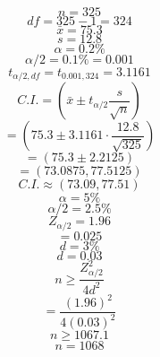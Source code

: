 \documentclass{article}
\begin{document}
    $$n=325$$
$$df = 325-1 = 324$$
$$\bar{x} = 75.3$$
$$s = 12.8$$
$$\alpha = 0.2\%$$
$$\alpha/2 = 0.1\% = 0.001$$
$$t_{\alpha/2, df} = t_{0.001, 324} = 3.1161$$
$$C.I. = \left(\bar{x} \pm t_{\alpha/2} \frac{s}{\sqrt{n}}\right)$$
$$= \left(75.3 \pm 3.1161 \cdot \frac{12.8}{\sqrt{325}}\right)$$
$$= (75.3 \pm 2.2125)$$
$$= (73.0875, 77.5125)$$
$$C.I. \approx (73.09, 77.51)$$
$$\alpha = 5\%$$
$$\alpha/2 = 2.5\%$$
$$Z_{\alpha/2} = 1.96$$
$$= 0.025$$
$$d = 3\%$$
$$d = 0.03$$
$$n \ge \frac{Z_{\alpha/2}^2}{4d^2}$$
$$= \frac{(1.96)^2}{4(0.03)^2}$$
$$n \ge 1067.1$$
$$n = 1068$$

    
\end{document}
